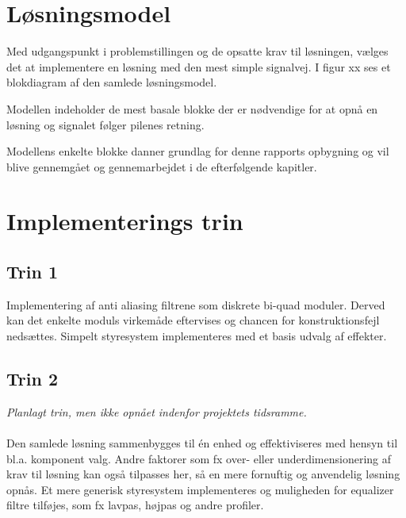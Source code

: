 \section{Løsningsmodel}
Med udgangspunkt i problemstillingen og de opsatte krav til løsningen, vælges det at implementere en løsning med den mest simple signalvej.
I figur xx ses et blokdiagram af den samlede løsningsmodel.


Modellen indeholder de mest basale blokke der er nødvendige for at opnå en løsning og signalet følger pilenes retning.

Modellens enkelte blokke danner grundlag for denne rapports opbygning og vil blive gennemgået og gennemarbejdet i de efterfølgende kapitler.


\section{Implementerings trin}

\subsection{Trin 1}
Implementering af anti aliasing filtrene som diskrete bi-quad moduler. 
Derved kan det enkelte moduls virkemåde eftervises og chancen for konstruktionsfejl nedsættes.
Simpelt styresystem implementeres med et basis udvalg af effekter.

\subsection{Trin 2}
\textit{Planlagt trin, men ikke opnået indenfor projektets tidsramme.}
\\
\\
Den samlede løsning sammenbygges til én enhed og effektiviseres med hensyn til bl.a. komponent valg. 
Andre faktorer som fx over- eller underdimensionering af krav til løsning kan også tilpasses her, så en mere fornuftig og anvendelig løsning opnås.
Et mere generisk styresystem implementeres og muligheden for equalizer filtre tilføjes, som fx lavpas, højpas og andre profiler. 
